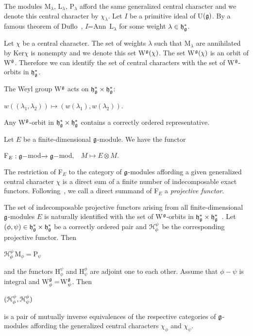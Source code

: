 \documentclass[12pt]{amsart}
\theoremstyle{definition}\newtheorem{theorem}{Theorem}[section]
\theoremstyle{definition}\newtheorem{definition}[proposition]{Definition}
\theoremstyle{remark}\newtheorem{example}[proposition]{Example}
\renewcommand{\to}[1][]{\xrightarrow{#1}}
\begin{document}
The modules M$_\lambda$, L$_\lambda$, P$_\lambda$ afford the same generalized central character and we denote this central character by $\chi_\lambda$. Let $I$ be a primitive ideal of U$(\frak g)$. By a famous theorem of Duflo~\cite{Dix}, $I$=Ann~L$_\lambda$ for some weight $\lambda\in\frak h_\frak g^*$.

Let $\chi$ be a central character. The set of weights $\lambda$ such that M$_\lambda$ are annihilated by Ker$\chi$ is nonempty and we denote this set W$^\frak g(\chi)$. The set W$^\frak g(\chi)$ is an orbit of W$^\frak g$. Therefore we can identify the set of central characters with the set of W$^\frak g$-orbits in $\frak h_\frak g^*$.

The Weyl group W$^\frak g$ acts on $\frak h_\frak g^*\times\frak h_\frak g^*$:\begin{center} $w((\lambda_1, \lambda_2))\mapsto (w(\lambda_1), w(\lambda_2))$.\end{center} Any W$^\frak g$-orbit in $\frak h_\frak g^*\times\frak h_\frak g^*$ contains a correctly ordered representative.

Let $E$ be a finite-dimensional $\frak g$-module. We have the functor\begin{center}F$_E:\frak g-$mod$\to\frak g-$mod$,\hspace{10pt} M\mapsto E\otimes M$.\end{center}The restriction of F$_E$ to the category of $\frak g$-modules affording a given generalized central character $\chi$ is a direct sum of a finite number of indecomposable exact functors. Following~\cite{BeG}, we call a direct summand of F$_E$ a {\it projective functor}.

The set of indecomposable projective functors arising from all finite-dimensional $\frak g$-modules $E$ is naturally identified with the set of W$^\frak g$-orbits in $\frak h_\frak g^*\times\frak h_\frak g^*$~\cite[3.3]{BeG}. Let $(\phi, \psi)\in\frak h_\frak g^*\times\frak h_\frak g^*$ be a correctly ordered pair and $\EuScript H_\phi^\psi$ be the corresponding projective functor. Then \begin{center}$\EuScript H_\phi^\psi$M$_\phi=$P$_\psi$\end{center} and the functors H$_\phi^\psi$ and H$_\psi^\phi$ are adjoint one to each other. Assume that $\phi-\psi$ is integral and W$^\frak g_\phi=$W$^\frak g_\psi$. Then \begin{center}$(\EuScript H_\phi^\psi, \EuScript H_\psi^\phi)$\end{center} is a pair of mutually inverse equivalences of the respective categories of $\frak g$-modules affording the generalized central characters $\chi_\phi$ and  $\chi_\psi$.
\end{document}
